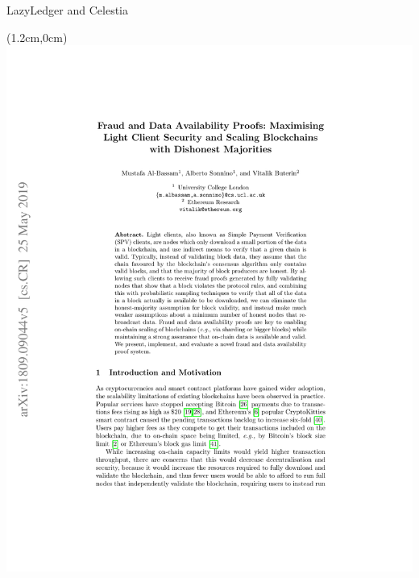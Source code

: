 \documentclass[10pt]{beamer}
\begin{document}
\begin{frame}[fragile]{LazyLedger and Celestia}
\begin{textblock*}{10cm}(1.2cm,0cm)
\includegraphics[trim={0 0 0 0},clip,scale=0.5]{fraud-and-data-availability-proofs.pdf}
\end{textblock*}
\end{frame}
\end{document}

